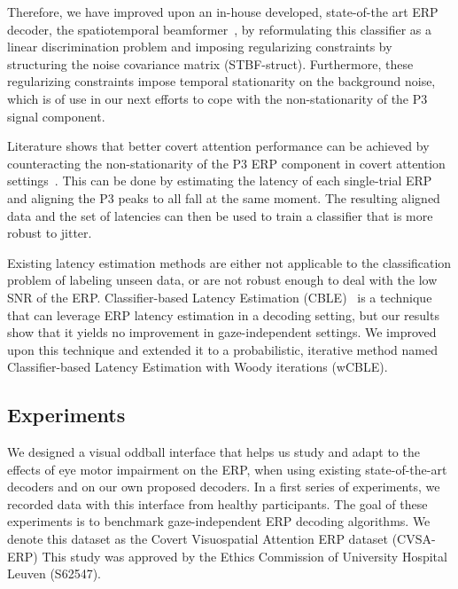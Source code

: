 Therefore, we have improved upon an in-house developed, state-of-the art ERP
decoder, the spatiotemporal beamformer~\cite{Wittevrongel2016}, by reformulating
this classifier as a linear discrimination problem and
imposing regularizing constraints by structuring the noise covariance matrix
(STBF-struct).
Furthermore, these regularizing constraints impose temporal stationarity on
the background noise, which is of use in our next efforts to cope with the
non-stationarity of the P3 signal component.

Literature shows that better covert attention performance can be achieved by
counteracting the non-stationarity of the P3 ERP component in covert
attention settings~\cite{Arico2014}.
This can be done by estimating the latency of each single-trial ERP and aligning
the P3 peaks to all fall at the same moment.
The resulting aligned data and the set of latencies can then be used to train a
classifier that is more robust to jitter.

Existing latency estimation methods are either not applicable to the
classification problem of labeling unseen data, or are not robust enough to
deal with the low SNR of the ERP.
Classifier-based Latency Estimation (CBLE)~\cite{Mowla2017} is a technique that can leverage
ERP latency estimation in a decoding setting, but our results show that it
yields no improvement in gaze-independent settings.
We improved upon this technique and extended it to a probabilistic, iterative
method named Classifier-based Latency Estimation with Woody iterations (wCBLE).


\subsection{Experiments}
We designed a visual oddball interface that helps us study and adapt
to the effects of eye motor impairment on the ERP, when using existing state-of-the-art
decoders and on our own proposed decoders.
In a first series of experiments, we recorded data with this interface from healthy participants.
The goal of these experiments is to benchmark
gaze-independent ERP decoding algorithms.
We denote this dataset as the Covert Visuospatial Attention ERP dataset
(CVSA-ERP)
This study was approved by the Ethics Commission of University Hospital Leuven
(S62547).


